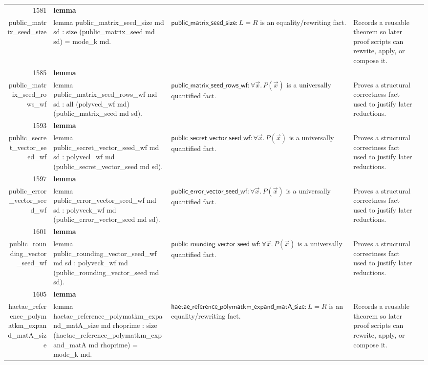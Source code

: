 \documentclass[10pt]{article}
\newcommand{\ec}[1]{\begingroup\ttfamily\scriptsize #1\endgroup}
\begin{document}
\begin{longtable}{r L{0.17\textwidth} L{0.26\textwidth} L{0.27\textwidth} L{0.20\textwidth}}
1581 & \textbf{lemma}\\\ec{public\_matrix\_seed\_size} & \ec{lemma public\_matrix\_seed\_size md sd : size (public\_matrix\_seed md sd) = mode\_k md.} & \(\mathsf{public\_matrix\_seed\_size} : L = R\) is an equality/rewriting fact. & Records a reusable theorem so later proof scripts can rewrite, apply, or compose it. \\
1585 & \textbf{lemma}\\\ec{public\_matrix\_seed\_rows\_wf} & \ec{lemma public\_matrix\_seed\_rows\_wf md sd : all (polyvecl\_wf md) (public\_matrix\_seed md sd).} & \(\mathsf{public\_matrix\_seed\_rows\_wf} : \forall \vec{x}.\, P(\vec{x})\) is a universally quantified fact. & Proves a structural correctness fact used to justify later reductions. \\
1593 & \textbf{lemma}\\\ec{public\_secret\_vector\_seed\_wf} & \ec{lemma public\_secret\_vector\_seed\_wf md sd : polyvecl\_wf md (public\_secret\_vector\_seed md sd).} & \(\mathsf{public\_secret\_vector\_seed\_wf} : \forall \vec{x}.\, P(\vec{x})\) is a universally quantified fact. & Proves a structural correctness fact used to justify later reductions. \\
1597 & \textbf{lemma}\\\ec{public\_error\_vector\_seed\_wf} & \ec{lemma public\_error\_vector\_seed\_wf md sd : polyveck\_wf md (public\_error\_vector\_seed md sd).} & \(\mathsf{public\_error\_vector\_seed\_wf} : \forall \vec{x}.\, P(\vec{x})\) is a universally quantified fact. & Proves a structural correctness fact used to justify later reductions. \\
1601 & \textbf{lemma}\\\ec{public\_rounding\_vector\_seed\_wf} & \ec{lemma public\_rounding\_vector\_seed\_wf md sd : polyveck\_wf md (public\_rounding\_vector\_seed md sd).} & \(\mathsf{public\_rounding\_vector\_seed\_wf} : \forall \vec{x}.\, P(\vec{x})\) is a universally quantified fact. & Proves a structural correctness fact used to justify later reductions. \\
1605 & \textbf{lemma}\\\ec{haetae\_reference\_polymatkm\_expand\_matA\_size} & \ec{lemma haetae\_reference\_polymatkm\_expand\_matA\_size md rhoprime : size (haetae\_reference\_polymatkm\_expand\_matA md rhoprime) = mode\_k md.} & \(\mathsf{haetae\_reference\_polymatkm\_expand\_matA\_size} : L = R\) is an equality/rewriting fact. & Records a reusable theorem so later proof scripts can rewrite, apply, or compose it. \\

\end{longtable}
\end{document}
